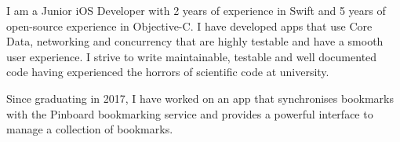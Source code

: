 %
I am a Junior iOS Developer with 2 years of experience in Swift and 5 years of
open-source experience in Objective-C. I have developed apps that use Core Data,
networking and concurrency that are highly testable and have a smooth user
experience. I strive to write maintainable, testable and well documented code
having experienced the horrors of scientific code at university.

\smallskip

Since graduating in 2017, I have worked on an app that synchronises bookmarks
with the Pinboard bookmarking service and provides a powerful interface to
manage a collection of bookmarks.

\bigskip

